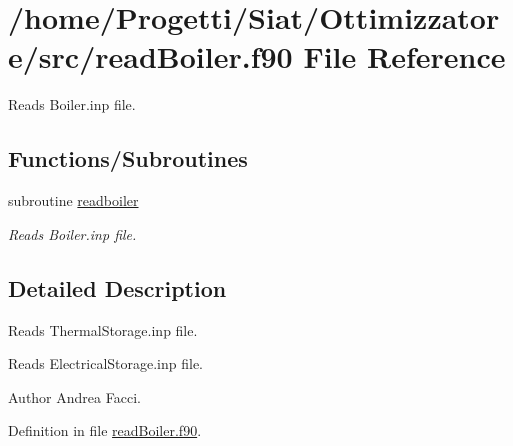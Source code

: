 \hypertarget{read_boiler_8f90}{\section{/home/\-Progetti/\-Siat/\-Ottimizzatore/src/read\-Boiler.f90 File Reference}
\label{read_boiler_8f90}
}


Reads Boiler.\-inp file.  


\subsection*{Functions/\-Subroutines}
\begin{DoxyCompactItemize}
\item 
subroutine \hyperlink{read_boiler_8f90_adab96107665a1fca087b8e0a54026105}{readboiler}
\begin{DoxyCompactList}\small\item\em Reads Boiler.\-inp file. \end{DoxyCompactList}\end{DoxyCompactItemize}


\subsection{Detailed Description}
Reads Thermal\-Storage.\-inp file.

Reads Electrical\-Storage.\-inp file.

\begin{DoxyAuthor}{Author}
Andrea Facci. 
\end{DoxyAuthor}


Definition in file \hyperlink{read_boiler_8f90_source}{read\-Boiler.\-f90}.



